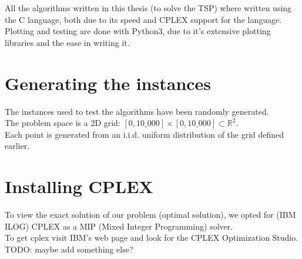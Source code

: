 All the algorithms written in this thesis (to solve the TSP) where written using the C language, both due to its speed and CPLEX support for the language.\\
Plotting and testing are done with Python3, due to it's extensive plotting libraries and the ease in writing it.

\section{Generating the instances}
The instances used to test the algorithms have been randomly generated.\\
The problem space is a 2D grid: $[0,10\_000]\times[0,10\_000]\subset\mathbb{R}^2$.\\
Each point is generated from an i.i.d. uniform distribution of the grid defined earlier.

\section{Installing CPLEX}
To view the exact solution of our problem (optimal solution), we opted for (IBM ILOG) CPLEX as a MIP (Mixed Integer Programming) solver.\\
To get cplex visit IBM's web page and look for the CPLEX Optimization Studio.\\
TODO: maybe add something else?\\

